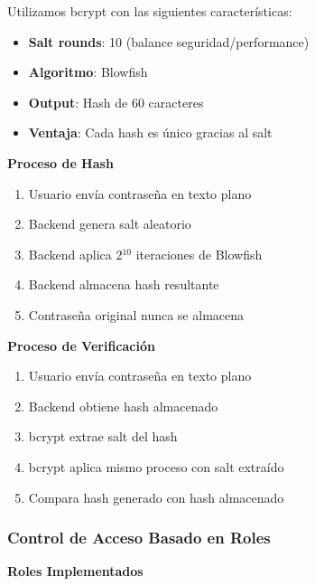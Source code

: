 \documentclass[12pt,a4paper]{article}
\begin{document}
Utilizamos bcrypt con las siguientes características:

\begin{itemize}
    \item \textbf{Salt rounds}: 10 (balance seguridad/performance)
    \item \textbf{Algoritmo}: Blowfish
    \item \textbf{Output}: Hash de 60 caracteres
    \item \textbf{Ventaja}: Cada hash es único gracias al salt
\end{itemize}

\textbf{Proceso de Hash}
\begin{enumerate}
    \item Usuario envía contraseña en texto plano
    \item Backend genera salt aleatorio
    \item Backend aplica 2$^{10}$ iteraciones de Blowfish
    \item Backend almacena hash resultante
    \item Contraseña original nunca se almacena
\end{enumerate}

\textbf{Proceso de Verificación}
\begin{enumerate}
    \item Usuario envía contraseña en texto plano
    \item Backend obtiene hash almacenado
    \item bcrypt extrae salt del hash
    \item bcrypt aplica mismo proceso con salt extraído
    \item Compara hash generado con hash almacenado
\end{enumerate}

\subsubsection{Control de Acceso Basado en Roles}

\textbf{Roles Implementados}
\end{document}
